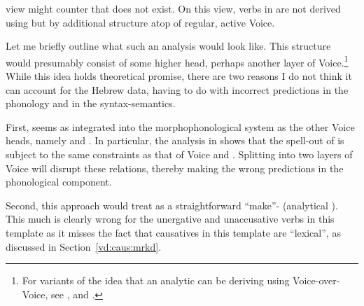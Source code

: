 \begin{exe}
\begin{xlist}
\begin{xlist}
\begin{exe}
\begin{exe}
\begin{xlist}
\begin{exe}
\begin{xlist}
\begin{exe}
\begin{xlist}
\begin{xlist}
\begin{exe}
\begin{xlist}
\begin{exe}
\begin{xlist}
\begin{exe}
\begin{exe}
\begin{exe}
\begin{xlist}
\begin{exe}
\begin{exe}
\begin{xlist}
\begin{xlist}
\begin{exe}
\begin{xlist}
\begin{exe}
\begin{exe}
\begin{exe}
\begin{xlist}
\begin{exe}
\begin{exe}
\begin{xlist}
\begin{exe}
\begin{xlist}
\begin{exe}
\begin{xlist}
\begin{exe}
\begin{xlist}
\begin{exe}
\begin{exe}
\begin{xlist}
\begin{exe}
\begin{exe}
\begin{xlist}
\begin{xlist}
\begin{exe}
\begin{xlist}
\begin{xlist}
\begin{exe}
\begin{xlist}
\begin{exe}
\begin{xlist}
\begin{exe}
\begin{xlist}
\begin{exe}
\begin{xlist}
\begin{exe}
\begin{exe}
\begin{exe}
\begin{exe}
\begin{xlist}
\begin{exe}
\begin{exe}
\begin{xlist}
\begin{xlist}
\begin{exe}
\begin{exe}
\begin{xlist}
\begin{exe}
\begin{xlist}
view might counter that {\vd} does not exist. On this view, verbs in {\thif} are not derived using {\vd} but by additional structure atop of regular, active Voice.

Let me briefly outline what such an analysis would look like. This structure would presumably consist of some higher  head, perhaps another layer of Voice.\footnote{For variants of the idea that an analytic  can be deriving using Voice-over-Voice, see \cite{tubinoblanco11}, \cite{harley13lingua,harley17oup} and \cite{nie20}.} While this idea holds theoretical promise, there are two reasons I do not think it can account for the Hebrew data, having to do with incorrect predictions in the phonology and in the syntax-semantics.

First, {\vd} seems as integrated into the morphophonological system as the other Voice heads, namely  and {\vz}. In particular, the analysis in \cite{kastner18nllt} shows that the spell-out of {\vd} is subject to the same  constraints as that of Voice and {\vz}. Splitting {\vd} into two layers of Voice will disrupt these  relations, thereby making the wrong predictions in the phonological component.

Second, this approach would treat {\thif} as a straightforward ``make''- (analytical ). This much is clearly wrong for the unergative and unaccusative verbs in this template as it misses the fact that causatives in this template are ``lexical'', as discussed in Section~\ref{vd:caus:mrkd}. 


\end{xlist}
\end{exe}
\end{xlist}
\end{exe}
\end{exe}
\end{xlist}
\end{xlist}
\end{exe}
\end{exe}
\end{xlist}
\end{exe}
\end{exe}
\end{exe}
\end{exe}
\end{xlist}
\end{exe}
\end{xlist}
\end{exe}
\end{xlist}
\end{exe}
\end{xlist}
\end{exe}
\end{xlist}
\end{xlist}
\end{exe}
\end{xlist}
\end{xlist}
\end{exe}
\end{exe}
\end{xlist}
\end{exe}
\end{exe}
\end{xlist}
\end{exe}
\end{xlist}
\end{exe}
\end{xlist}
\end{exe}
\end{xlist}
\end{exe}
\end{exe}
\end{xlist}
\end{exe}
\end{exe}
\end{exe}
\end{xlist}
\end{exe}
\end{xlist}
\end{xlist}
\end{exe}
\end{exe}
\end{xlist}
\end{exe}
\end{exe}
\end{exe}
\end{xlist}
\end{exe}
\end{xlist}
\end{exe}
\end{xlist}
\end{xlist}
\end{exe}
\end{xlist}
\end{exe}
\end{xlist}
\end{exe}
\end{exe}
\end{xlist}
\end{xlist}
\end{exe}
